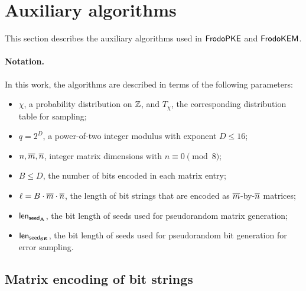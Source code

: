 \section{Auxiliary algorithms}%
\label{sec:algs}

This section describes the auxiliary algorithms used in $\textsf{\upshape\mdseries FrodoPKE}$ and $\textsf{\upshape\mdseries FrodoKEM}$.


\paragraph{Notation.}
In this work, the algorithms are described in terms of the following parameters:
\begin{itemize}
\item $\chi$, a probability distribution on $\mathbb{Z}$, and $T_\chi$, the corresponding distribution table for sampling;
\item $q=2^D$, a power-of-two integer modulus with exponent $D\leq 16$;
\item $n,\overline{m},\overline{n}$, integer matrix dimensions with $n \equiv 0 \pmod 8$;
\item $B\leq D$, the number of bits encoded in each matrix entry;
\item $\ell=B\cdot \overline{m}\cdot\overline{n}$, the length of bit strings that are encoded as $\overline{m}$-by-$\overline{n}$ matrices;
\item ${\mathsf{len}_{{\mathsf{seed}_{\mathbf{A}}}}}$, the bit length of seeds used for pseudorandom matrix generation;
\item ${\mathsf{len}_{{\mathsf{seed}_{\mathbf{S}\mathbf{E}}}}}$, the bit length of seeds used for pseudorandom bit generation for error sampling.
\end{itemize}


\subsection{Matrix encoding of bit strings}
\label{sec:matrix-encoding}

